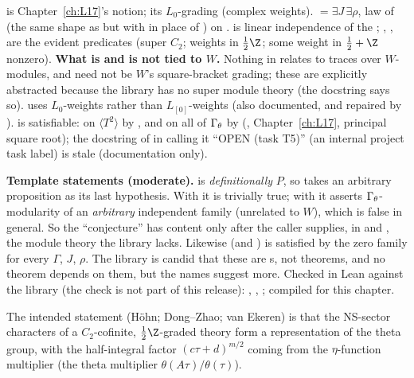 \begin{dictionary}
 is Chapter~\ref{ch:L17}'s notion;  its $L_0$-grading (complex weights).
 $=\exists J\,\exists\rho$, law of  (the same shape as
 but with  in place of ) on . 
is linear independence of the ; , ,  are the
evident predicates (super $C_2$; weights in $\frac12\Z$; some weight in $\frac12+\Z$ nonzero). \textbf{What is and is not tied
to $W$.} Nothing in  relates  to traces over $W$-modules, and  need not be
$W$'s square-bracket grading; these are explicitly abstracted because the library has no super module theory (the docstring
says so).  uses $L_0$-weights rather than $L_{[0]}$-weights (also documented, and repaired by
).  is satisfiable: on $\langle T^2\rangle$ by , and on all
of $\Gamma_\theta$ by  (, Chapter~\ref{ch:L17}, principal square
root); the docstring of  in  calling it ``OPEN (task T5)'' (an internal project task label) is
stale (documentation only).
\end{dictionary}
\begin{warning}
\textbf{Template statements (moderate).}  is \emph{definitionally} $P$, so  takes an arbitrary proposition as its last hypothesis. With  it is trivially true; with  it asserts $\Gamma_\theta$-modularity of an \emph{arbitrary} independent family  (unrelated to $W$), which is false
in general. So the ``conjecture'' has content only after the caller supplies, in  and , the module theory
the library lacks. Likewise  (and ) is satisfied by the zero family for every
$\Gamma$, $J$, $\rho$. The library is candid that these are s, not theorems, and no theorem depends on them, but
the names suggest more. Checked in Lean against the library (the check is not part of this release):
, , ; compiled for this chapter.
\end{warning}
\begin{physics}
The intended statement (Höhn; Dong--Zhao; van Ekeren) is that the NS-sector characters of a $C_2$-cofinite, $\frac12\Z$-graded
theory form a representation of the theta group, with the half-integral factor $(c\tau+d)^{m/2}$ coming from the
$\eta$-function multiplier (the theta multiplier $\theta(A\tau)/\theta(\tau)$).
\end{physics}


